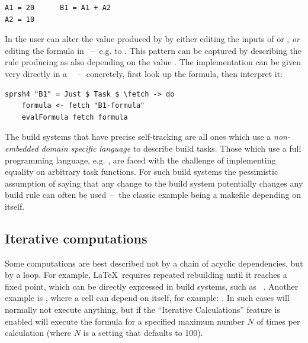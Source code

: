\vspace{0.5mm}
\begin{verbatim}
A1 = 20      B1 = A1 + A2
A2 = 10
\end{verbatim}
\vspace{0.5mm}

\noindent
In \Excel the user can alter the value produced by  by either editing
the inputs of  or , \emph{or} editing the formula in
~--~e.g. to . This pattern can be captured by describing
the rule producing  as also depending on the value .
The implementation can be given very directly in a
~~--~concretely, first look up the formula, then interpret
it:

\vspace{0.5mm}
\begin{verbatim}
sprsh4 "B1" = Just $ Task $ \fetch -> do
    formula <- fetch "B1-formula"
    evalFormula fetch formula
\end{verbatim}
\vspace{0.5mm}

\noindent
The build systems that have precise self-tracking are all ones which use a
\emph{non-embedded domain specific language} to describe build tasks. Those
which use a full programming language, e.g. \Shake, are faced with the challenge
of implementing equality on arbitrary task functions. For such build systems the
pessimistic assumption of saying that any change to the build system potentially
changes any build rule can often be used~--~the classic example being a makefile
depending on itself.

\subsection{Iterative computations}\label{sec-iterative-compute}

Some computations are best described not by a chain of acyclic dependencies,
but by a loop. For example, \LaTeX~requires repeated rebuilding until it
reaches a fixed point, which can be directly expressed in build systems, such as
\Pluto~\cite{erdweg2015pluto}. Another example is \Excel, where a cell can
depend on itself, for example: . In such cases \Excel will
normally not execute anything, but if the ``Iterative Calculations'' feature is
enabled will execute the formula for a specified maximum number $N$ of times per
calculation (where $N$ is a setting that defaults to 100).

